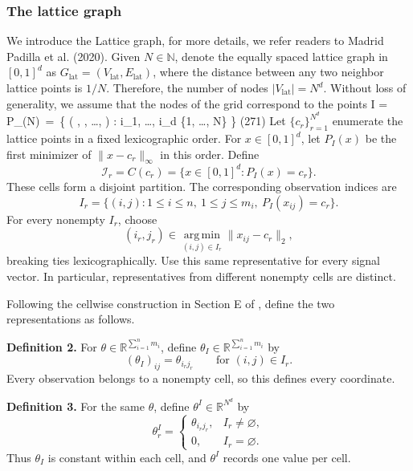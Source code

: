 \documentclass[twoside,11pt]{article}
\newenvironment{revision}{\color{revisionred}}{}
\begin{document}
\subsubsection{The lattice graph}
\label{knn_notation}
We introduce the Lattice graph, for more details, we refer readers to Madrid Padilla et al. (2020).
Given \( N \in \mathbb{N} \), denote the equally spaced lattice graph in \( [0,1]^d \) as \( G_\text{lat} = (V_\text{lat}, E_\text{lat}) \), where the distance between any two neighbor lattice points is \( 1/N \). Therefore, the number of nodes \( |V_\text{lat}| = N^d \). Without loss of generality, we assume that the nodes of the grid correspond to the points
\beq 
\label{lat_g}
I = P_(N) \,=\, \left\{ \left( , , \ldots,  \right) : i_1, \ldots, i_d \in \{1, \ldots, N\} \right\} \quad (271)
\beq 
\begin{revision}
Let $\{c_r\}_{r=1}^{N^d}$ enumerate the lattice points in a fixed
lexicographic order. For $x\in[0,1]^d$, let $P_I(x)$ be the first
minimizer of $\|x-c_r\|_\infty$ in this order. Define
\begin{equation}
\label{knn_center}
\mathcal I_r=C(c_r)=\{x\in[0,1]^d:P_I(x)=c_r\}.
\end{equation}
These cells form a disjoint partition. The corresponding observation
indices are
\begin{equation}
\label{I_r}
I_r=\{(i,j):1\leq i\leq n,\ 1\leq j\leq m_i,\
                         P_I(x_{ij})=c_r\}.
\end{equation}
For every nonempty $I_r$, choose
\[
(i_r,j_r)\in\operatorname*{arg\,min}_{(i,j)\in I_r}\|x_{ij}-c_r\|_2,
\]
breaking ties lexicographically. Use this same representative for
every signal vector. In particular, representatives from different
nonempty cells are distinct.

Following the cellwise construction in Section E of
\cite{madrid2020adaptive}, define the two representations as follows.

\textbf{Definition 2.}
For $\theta\in\mathbb R^{\sum_{i=1}^n m_i}$, define
$\theta_I\in\mathbb R^{\sum_{i=1}^n m_i}$ by
\[
(\theta_I)_{ij}=\theta_{i_rj_r}\qquad\text{for }(i,j)\in I_r.
\]
Every observation belongs to a nonempty cell, so this defines
every coordinate.

\textbf{Definition 3.}
For the same $\theta$, define $\theta^I\in\mathbb R^{N^d}$ by
\[
\theta^I_r=
\begin{cases}
\theta_{i_rj_r},&I_r\ne\varnothing,\\
0,&I_r=\varnothing.
\end{cases}
\]
Thus $\theta_I$ is constant within each cell, and $\theta^I$ records
one value per cell.
\end{revision}
\end{document}
